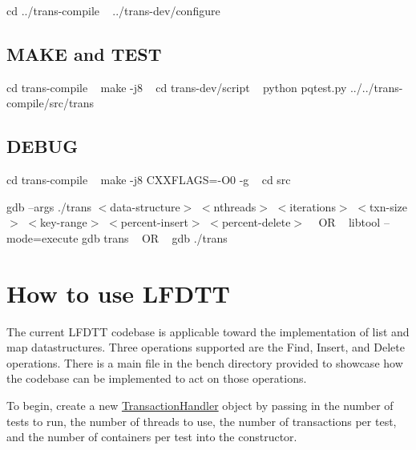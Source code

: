  cd ../trans-\/compile ~\newline
 ../trans-\/dev/configure ~\newline
\hypertarget{index_step5}{}\subsection{M\+A\+K\+E and T\+E\+ST}\label{index_step5}
cd trans-\/compile ~\newline
 make -\/j8 ~\newline
 cd trans-\/dev/script ~\newline
 python pqtest.\+py ../../trans-\/compile/src/trans ~\newline
\hypertarget{index_step6}{}\subsection{D\+E\+B\+UG}\label{index_step6}
cd trans-\/compile ~\newline
 make -\/j8 C\+X\+X\+F\+L\+A\+GS=\textquotesingle{}-\/\+O0 -\/g\textquotesingle{} ~\newline
 cd src ~\newline


gdb --args ./trans $<$data-\/structure$>$ $<$nthreads$>$ $<$iterations$>$ $<$txn-\/size$>$ $<$key-\/range$>$ $<$percent-\/insert$>$ $<$percent-\/delete$>$ ~\newline
 OR ~\newline
 libtool --mode=execute gdb trans ~\newline
 OR ~\newline
 gdb ./trans ~\newline
\hypertarget{index_usage_sec}{}\section{How to use L\+F\+D\+TT}\label{index_usage_sec}
The current L\+F\+D\+TT codebase is applicable toward the implementation of list and map datastructures. Three operations supported are the Find, Insert, and Delete operations. There is a main file in the bench directory provided to showcase how the codebase can be implemented to act on those operations.

To begin, create a new \hyperlink{classTransactionHandler}{Transaction\+Handler} object by passing in the number of tests to run, the number of threads to use, the number of transactions per test, and the number of containers per test into the constructor.~\newline


